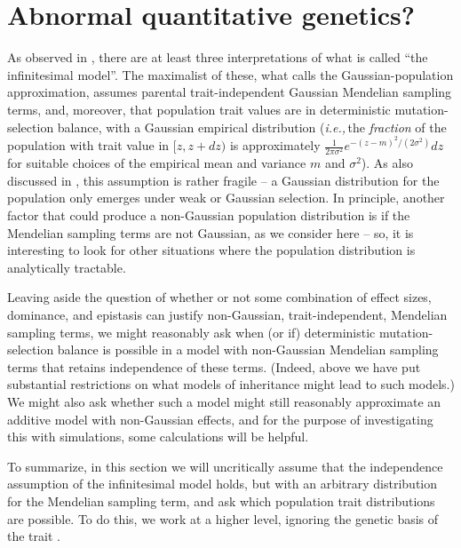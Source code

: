 \documentclass{article}
\newcommand{\ie}{\textit{i.e.,}\,}
\newcommand{\1}{\mathbbm{1}}
\theoremstyle{remark}
\theoremstyle{definition}
\begin{document}
\section{Abnormal quantitative genetics?}
    \label{sec:abnormal}

As observed in \cite{turelli2017commentary},
there are at least three interpretations of what is called ``the infinitesimal model''. 
The maximalist of these, what \cite{turelli2017commentary} calls the Gaussian-population approximation,
assumes parental trait-independent Gaussian Mendelian sampling terms,
and, moreover, that  population trait values are in deterministic mutation-selection balance, with a Gaussian empirical distribution
(\ie the \emph{fraction} of the population with trait value in $[z,z+dz)$
is approximately $\frac{1}{2\pi\sigma^{2}} e^{-(z-m)^{2}/(2\sigma^{2})} dz$
for suitable choices of the empirical mean and variance $m$ and $\sigma^{2}$).
As also discussed in \citet{turelli2017commentary}, 
this assumption is rather fragile --
a Gaussian distribution for the population only emerges under weak or Gaussian selection.
In principle, another factor that could produce a non-Gaussian population distribution
is if the Mendelian sampling terms are not Gaussian, as we consider here --
so, it is interesting to look for other situations where the population distribution is analytically tractable.

Leaving aside 
the question of whether or not some combination of effect sizes, dominance, and epistasis can justify non-Gaussian, trait-independent,  Mendelian sampling terms, we might reasonably ask when (or if)
deterministic mutation-selection balance is possible in a model with non-Gaussian Mendelian sampling terms
that retains independence of these terms.
(Indeed, above we have put substantial restrictions on what models of inheritance
might lead to such models.)
We might also ask whether such a model
might still reasonably approximate an additive model with non-Gaussian effects,
and for the purpose of investigating this with simulations,
some calculations will be helpful.

To summarize, in this section we will uncritically assume that 
the independence assumption of the infinitesimal model holds,
but with an arbitrary distribution for the Mendelian sampling term,
and ask which population trait distributions are possible.
To do this, we work at a higher level,
ignoring the genetic basis of the trait
\citep[and certainly not using the specific set-up of][]{barton2017infinitesimal}.
\end{document}
